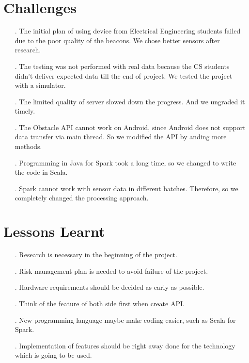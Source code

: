 \documentclass[prodmode,acmtosem]{acmsmall} %
\begin{document}
\section{Challenges}
\begin{itemize}
\item[.] The initial plan of using device from Electrical Engineering students failed due to the poor quality of the beacons. We chose better sensors after research.
\item[.] The testing was not performed with real data because the CS students didn't deliver expected data till the end of project. We tested the project with a simulator.
\item[.] The limited quality of server slowed down the progress. And we ungraded it timely.
\item[.] The Obstacle API cannot work on Android, since Android does not support data transfer via main thread. So we modified the API by anding more methods.
\item[.] Programming in Java for Spark took a long time, so we changed to write the code in Scala.
\item[.] Spark cannot work with sensor data in different batches. Therefore, so we completely changed the processing approach.
\end{itemize}


\section{Lessons Learnt}
\begin{itemize}
\item[.] Research is necessary in the beginning of the project.
\item[.] Risk management plan is needed to avoid failure of the project.
\item[.] Hardware requirements should be decided as early as possible.
\item[.] Think of the feature of both side first when create API.
\item[.] New programming language maybe make coding easier, such as Scala for Spark.
\item[.] Implementation of features should be right away done for the technology which is going to be used.
\end{itemize}
\end{document}
